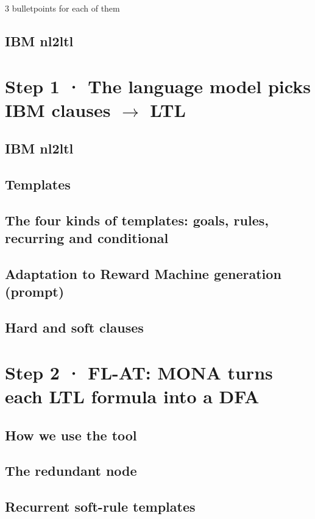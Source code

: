 \documentclass[11pt,english,listoffigures,listoftables, listofalgorithms]{tfgetsinf}
\begin{document}
3 bulletpoints for each of them  

\subsection{IBM nl2ltl}
\section{Step 1 · The language model picks IBM clauses \texorpdfstring{$\rightarrow$}{->} LTL}

\label{sec:step1}
\subsection{IBM nl2ltl}
\subsection{Templates}
\subsection{The four kinds of templates: goals, rules, recurring and conditional}
\subsection{Adaptation to Reward Machine generation (prompt)}
\subsection{Hard and soft clauses}
\section{Step 2 · FL-AT: MONA turns each LTL formula into a DFA}
\label{sec:step2}
\subsection{How we use the tool}
\subsection{The redundant node}
\subsection{Recurrent soft-rule templates}
\end{document}
